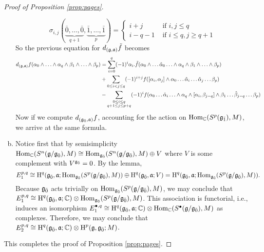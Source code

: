 \begin{proof}[Proof of Proposition \ref{prop:pages}]
\begin{enumerate}[(a)]
\[\]
\[
    \sigma_{i,j}(\underbrace{\bar 0,\ldots,\bar 0}_{q+1},\underbrace{\bar 1,\ldots,\bar 1}_p) = \begin{cases}
      i + j &\text{ if } i,j \leq q \\
      i - q - 1 &\text{ if } i \leq q, j \geq q+1
    \end{cases}
 \]
So the previous equation for $d_{(\mathfrak{g},\mathfrak{a})}\tilde f$ becomes
  \begin{align*}
    d_{(\mathfrak{g},\mathfrak{a})}f(\alpha_0\wedge \ldots \wedge \alpha_q \wedge \beta_1 \wedge \ldots \wedge \beta_p) &= \sum_{i = 0}^q (-1)^{i} \alpha_i.\tilde{f}(\alpha_0\wedge \ldots \hat \alpha_0 \ldots \wedge \alpha_q \wedge \beta_1 \wedge \ldots \wedge \beta_p) \\
                                                                                                    &+ \sum_{0 \leq i < j \leq q} (-1)^{i+j}f([\alpha_i,\alpha_j] \wedge \alpha_0 \ldots \hat \alpha_i \ldots \hat \alpha_j \ldots \beta_p) \\
                                                                                                    &- \sum_{\substack{0 \leq i \leq q \\ q+1 \leq j \leq p+q}} (-1)^{i} f(\alpha_0 \ldots \hat \alpha_i \ldots \wedge \alpha_q \wedge [\alpha_i,\beta_{j-q}] \wedge \beta_1\ldots \hat \beta_{j-q} \ldots \beta_p) \\
  \end{align*}
  Now if we compute $d_{({\mathfrak{g}}_{\bar{0}},\mathfrak{a})}f$, accounting for the action on $\operatorname{Hom}_{\mathbb{C}}(S^p({\mathfrak{g}}_{\bar{1}}),M)$, we arrive at the same formula.
\item Notice first that by semisimplicity $\operatorname{Hom}_{\mathbb{C}}(S^n(\mathfrak{g}/{\mathfrak{g}}_{\bar{0}}),M) \cong \operatorname{Hom}_{{\mathfrak{g}}_{\bar{0}}}(S^n(\mathfrak{g}/{\mathfrak{g}}_{\bar{0}}),M) \oplus V$ where $V$ is some complement with $V^{{\mathfrak{g}}_{\bar{0}}} = 0$. By the lemma,
  \[
    E_1^{p,q} \cong \operatorname{H}^q({\mathfrak{g}}_{\bar{0}},\mathfrak{a};\operatorname{Hom}_{{\mathfrak{g}}_{\bar{0}}}(S^p(\mathfrak{g}/{\mathfrak{g}}_{\bar{0}}),M)) \oplus \operatorname{H}^q({\mathfrak{g}}_{\bar{0}},\mathfrak{a};V) = \operatorname{H}^q({\mathfrak{g}}_{\bar{0}},\mathfrak{a};\operatorname{Hom}_{{\mathfrak{g}}_{\bar{0}}}(S^p(\mathfrak{g}/{\mathfrak{g}}_{\bar{0}}),M)).
  \]
  Because ${\mathfrak{g}}_{\bar{0}}$ acts trivially on $\operatorname{Hom}_{{\mathfrak{g}}_{\bar{0}}}(S^p(\mathfrak{g}/{\mathfrak{g}}_{\bar{0}}),M)$, we may conclude that $E_1^{p,q} \cong \operatorname{H}^q({\mathfrak{g}}_{\bar{0}},\mathfrak{a};\mathbb{C}) \otimes \operatorname{Hom}_{{\mathfrak{g}}_{\bar{0}}}(S^p(\mathfrak{g}/{\mathfrak{g}}_{\bar{0}}),M)$. This association is functorial, i.e., induces an isomorphism $E_1^{\bullet,q} \cong \operatorname{H}^q({\mathfrak{g}}_{\bar{0}},\mathfrak{a};\mathbb{C}) \otimes \operatorname{Hom}_{\mathbb{C}}(S^\bullet(\mathfrak{g}/{\mathfrak{g}}_{\bar{0}}),M)$ as complexes. Therefore, we may conclude that $E_2^{p,q} \cong \operatorname{H}^q({\mathfrak{g}}_{\bar{0}},\mathfrak{a};\mathbb{C}) \otimes \operatorname{H}^p(\mathfrak{g},{\mathfrak{g}}_{\bar{0}};M)$.
\end{enumerate}
This completes the proof of Proposition \ref{prop:pages}.
\end{proof}


